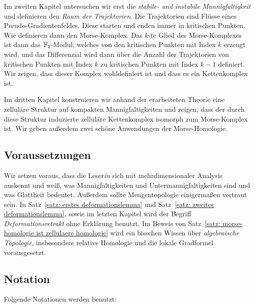 \documentclass[a4paper,11pt,twoside]{scrreport}
\begin{document}
Im zweiten Kapitel untersuchen wir erst die \textit{stabile- und instabile Mannigfaltigkeit} und 
definieren den \textit{Raum der Trajektorien}. Die Trajektorien sind Flüsse eines Pseudo-Gradien\-ten\-feldes.
Diese starten und enden immer in kritischen Punkten. Wie definieren dann den Morse-Komplex.
Das $k$-te Glied des Morse-Komplexes ist dann das ${ \mathbb F }_2$-Modul, welches von den kritischen 
Punkten mit Index $k$ erzeugt wird, und das Differenzial wird dann über die Anzahl der 
Trajektorien von kritischen Punkten mit Index $k$ zu kritischen Punkten mit Index $k - 1$ 
definiert. Wir zeigen, dass dieser Komplex wohldefiniert ist und dass es ein Kettenkomplex ist. 

Im dritten Kapitel konstruieren wir anhand der erarbeiteten Theorie eine zelluläre Struktur auf kompakten 
Mannigfaltigkeiten und zeigen, dass der durch diese Struktur induzierte zelluläre Kettenkomplex 
isomorph zum Morse-Komplex ist. Wir geben außerdem zwei schöne Anwendungen der Morse-Homologie.

\subsection*{Voraussetzungen}

Wir setzen voraus, dass die Leser\textit{in} sich mit mehrdimensionaler Analysis auskennt und weiß, was 
Mannigfaltigkeiten und Untermannigfaltigkeiten sind und was Glattheit bedeutet. Außerdem sollte 
Mengentopologie einigermaßen vertraut sein. In Satz~\ref{satz: erstes deformationslemma}
und Satz~\ref{satz: zweites deformationslemma}, sowie im letzten Kapitel wird der Begriff
\textit{Deformationsretrakt} ohne Erklärung benutzt. Im Beweis von 
Satz~\ref{satz: morse-homologie ist zellulaere homologie} wird ein bisschen Wissen über 
\textit{algebraische Topologie}, insbesondere relative Homologie und die lokale Gradformel 
vorausgesetzt. 

\subsection*{Notation}

Folgende Notationen werden benutzt:
\end{document}
